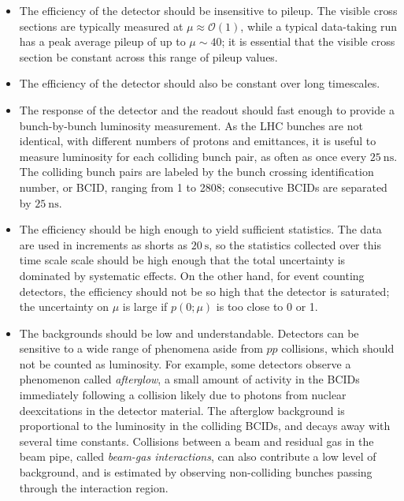 \begin{itemize}
	\item The efficiency of the detector should be insensitive to pileup. The visible cross sections are typically measured at $\mu\approx \mathcal{O}(1)$, while a typical data-taking run has a peak average pileup of up to $\mu\sim40$; it is essential that the visible cross section be constant across this range of pileup values.

	\item The efficiency of the detector should also be constant over long timescales.

	\item The response of the detector and the readout should fast enough to provide a bunch-by-bunch luminosity measurement. As the LHC bunches are not identical, with different numbers of protons and emittances, it is useful to measure luminosity for each colliding bunch pair, as often as once every $\SI{25}{\nano\second}$. The colliding bunch pairs are labeled by the bunch crossing identification number, or BCID, ranging from 1 to 2808; consecutive BCIDs are separated by $\SI{25}{\nano\second}$.

	\item The efficiency should be high enough to yield sufficient statistics. The data are used in increments as shorts as $\SI{20}{\second}$, so the statistics collected over this time scale scale should be high enough that the total uncertainty is dominated by systematic effects. On the other hand, for event counting detectors, the efficiency should not be so high that the detector is saturated; the uncertainty on $\mu$ is large if $p(0;\mu)$ is too close to 0 or 1. 

	\item The backgrounds should be low and understandable. Detectors can be sensitive to a wide range of phenomena aside from $pp$ collisions, which should not be counted as luminosity. For example, some detectors observe a phenomenon called \emph{afterglow}, a small amount of activity in the BCIDs immediately following a collision likely due to photons from nuclear deexcitations in the detector material. The afterglow background is proportional to the luminosity in the colliding BCIDs, and decays away with several time constants. Collisions between a beam and residual gas in the beam pipe, called \emph{beam-gas interactions}, can also contribute a low level of background, and is estimated by observing non-colliding bunches passing through the interaction region.

\end{itemize}

